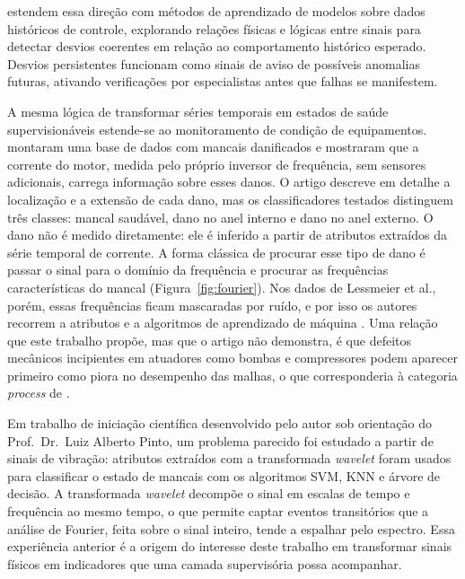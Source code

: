  estendem essa direção com métodos de aprendizado de modelos sobre dados históricos de controle, explorando relações físicas e lógicas entre sinais para detectar desvios coerentes em relação ao comportamento histórico esperado. Desvios persistentes funcionam como sinais de aviso de possíveis anomalias futuras, ativando verificações por especialistas antes que falhas se manifestem.

A mesma lógica de transformar séries temporais em estados de saúde supervisionáveis estende-se ao monitoramento de condição de equipamentos.  montaram uma base de dados com mancais danificados e mostraram que a corrente do motor, medida pelo próprio inversor de frequência, sem sensores adicionais, carrega informação sobre esses danos. O artigo descreve em detalhe a localização e a extensão de cada dano, mas os classificadores testados distinguem três classes: mancal saudável, dano no anel interno e dano no anel externo. O dano não é medido diretamente: ele é inferido a partir de atributos extraídos da série temporal de corrente. A forma clássica de procurar esse tipo de dano é passar o sinal para o domínio da frequência e procurar as frequências características do mancal (Figura~\ref{fig:fourier}). Nos dados de Lessmeier et al., porém, essas frequências ficam mascaradas por ruído, e por isso os autores recorrem a atributos e a algoritmos de aprendizado de máquina \cite{Lessmeier2016}. Uma relação que este trabalho propõe, mas que o artigo não demonstra, é que defeitos mecânicos incipientes em atuadores como bombas e compressores podem aparecer primeiro como piora no desempenho das malhas, o que corresponderia à categoria \textit{process} de .

Em trabalho de iniciação científica desenvolvido pelo autor sob orientação do Prof.\ Dr.\ Luiz Alberto Pinto, um problema parecido foi estudado a partir de sinais de vibração: atributos extraídos com a transformada \textit{wavelet} foram usados para classificar o estado de mancais com os algoritmos SVM, KNN e árvore de decisão. A transformada \textit{wavelet} decompõe o sinal em escalas de tempo e frequência ao mesmo tempo, o que permite captar eventos transitórios que a análise de Fourier, feita sobre o sinal inteiro, tende a espalhar pelo espectro. Essa experiência anterior é a origem do interesse deste trabalho em transformar sinais físicos em indicadores que uma camada supervisória possa acompanhar.

